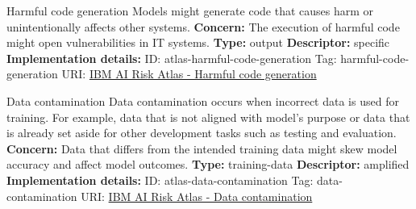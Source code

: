 \documentclass[a4paper,12pt]{article}
\begin{document}
\begin{definitionbox}{Harmful code generation}
Models might generate code that causes harm or unintentionally affects other systems.\newline\newline
\textbf{Concern: }The execution of harmful code might open vulnerabilities in IT systems.\newline\newline
\textbf{Type: }output\newline
\textbf{Descriptor: }specific \newline\newline
\textbf{Implementation details: } \newline
ID: atlas-harmful-code-generation \newline
Tag: harmful-code-generation \newline
URI:  \href{https://www.ibm.com/docs/en/watsonx/saas?topic=SSYOK8/wsj/ai-risk-atlas/harmful-code-generation.html}{IBM AI Risk Atlas - Harmful code generation}\newline
\end{definitionbox}
\begin{definitionbox}{Data contamination}
Data contamination occurs when incorrect data is used for training. For example, data that is not aligned with model's purpose or data that is already set aside for other development tasks such as testing and evaluation.\newline\newline
\textbf{Concern: }Data that differs from the intended training data might skew model accuracy and affect model outcomes.\newline\newline
\textbf{Type: }training-data\newline
\textbf{Descriptor: }amplified \newline\newline
\textbf{Implementation details: } \newline
ID: atlas-data-contamination \newline
Tag: data-contamination \newline
URI:  \href{https://www.ibm.com/docs/en/watsonx/saas?topic=SSYOK8/wsj/ai-risk-atlas/data-contamination.html}{IBM AI Risk Atlas - Data contamination}\newline
\end{definitionbox}
\end{document}
